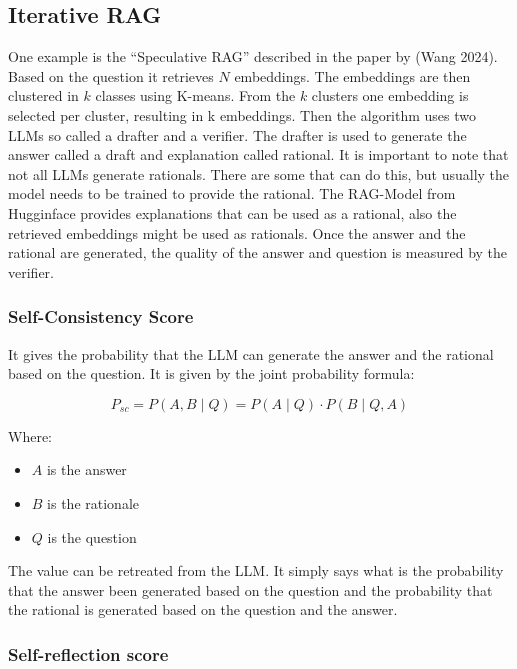 \documentclass{wseas}
\begin{document}
\subsection{Iterative RAG}

One example is the ``Speculative RAG'' described in the paper \cite{cite18}
by (Wang 2024). Based on the question it retrieves \(N\) embeddings. The
embeddings are then clustered in \(k\) classes using K-means. From the
\(k\) clusters one embedding is selected per cluster, resulting in k
embeddings. Then the algorithm uses two LLMs so called a drafter and a
verifier. The drafter is used to generate the answer called a draft and
explanation called rational. It is important to note that not all LLMs
generate rationals. There are some that can do this, but usually the
model needs to be trained to provide the rational. The RAG-Model from
Hugginface provides explanations that can be used as a rational, also
the retrieved embeddings might be used as rationals. Once the answer and
the rational are generated, the quality of the answer and question is
measured by the verifier.

\subsubsection{Self-Consistency Score}

It gives the probability that the LLM can generate the answer and the
rational based on the question. It is given by the joint probability
formula:

\begin{equation}
  P_{sc} = P(A,B \mid Q) = P(A \mid Q) \cdot P(B \mid Q, A)
\end{equation}
  
Where:
\begin{itemize}
  \item \( A \) is the answer
  \item \( B \) is the rationale
  \item \( Q \) is the question
\end{itemize}

The value can be retreated from the LLM. It simply says what is the
probability that the answer been generated based on the question and the
probability that the rational is generated based on the question and the
answer.

\subsubsection{Self-reflection score}
\end{document}
